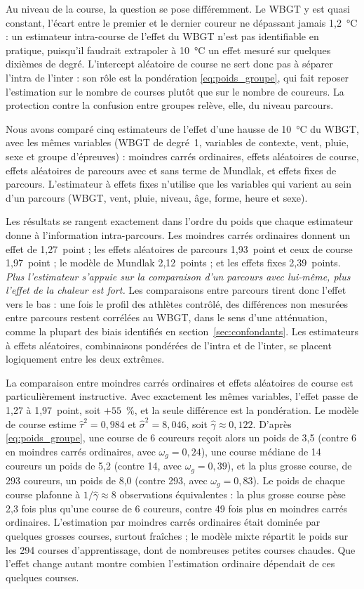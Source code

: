 \documentclass[11pt,a4paper]{article}
\begin{document}
Au niveau de la course, la question se pose différemment. Le WBGT y est quasi constant, l'écart entre le premier et le
dernier coureur ne dépassant jamais 1,2~°C : un estimateur intra-course de l'effet du WBGT n'est pas identifiable en
pratique, puisqu'il faudrait extrapoler à 10~°C un effet mesuré sur quelques dixièmes de degré. L'intercept aléatoire
de course ne sert donc pas à séparer l'intra de l'inter : son rôle est la pondération \eqref{eq:poids_groupe}, qui
fait reposer l'estimation sur le nombre de courses plutôt que sur le nombre de coureurs. La protection contre la
confusion entre groupes relève, elle, du niveau parcours.

Nous avons comparé cinq estimateurs de l'effet d'une hausse de 10~°C du WBGT, avec les mêmes variables (WBGT de
degré~1, variables de contexte, vent, pluie, sexe et groupe d'épreuves) : moindres carrés ordinaires, effets
aléatoires de course, effets aléatoires de parcours avec et sans terme de Mundlak, et effets fixes de parcours.
L'estimateur à effets fixes n'utilise que les variables qui varient au sein d'un parcours (WBGT, vent, pluie, niveau,
âge, forme, heure et sexe).

Les résultats se rangent exactement dans l'ordre du poids que chaque estimateur donne à l'information
intra-parcours. Les moindres carrés ordinaires donnent un effet de 1,27~point ; les effets aléatoires de parcours
1,93~point et ceux de course 1,97~point ; le modèle de Mundlak 2,12~points ; et les effets fixes 2,39~points.
\emph{Plus l'estimateur s'appuie sur la comparaison d'un parcours avec lui-même, plus l'effet de la chaleur est
fort.} Les comparaisons entre parcours tirent donc l'effet vers le bas : une fois le profil des athlètes contrôlé, des
différences non mesurées entre parcours restent corrélées au WBGT, dans le sens d'une atténuation, comme la plupart
des biais identifiés en section~\ref{sec:confondants}. Les estimateurs à effets aléatoires, combinaisons pondérées
de l'intra et de l'inter, se placent logiquement entre les deux extrêmes.

La comparaison entre moindres carrés ordinaires et effets aléatoires de course est particulièrement instructive.
Avec exactement les mêmes variables, l'effet passe de 1,27 à 1,97~point, soit $+55$~\%, et la seule différence est la
pondération. Le modèle de course estime $\hat\tau^2 = 0{,}984$ et $\hat\sigma^2 = 8{,}046$, soit
$\hat\gamma \approx 0{,}122$. D'après \eqref{eq:poids_groupe}, une course de 6 coureurs reçoit alors un poids de 3,5
(contre 6 en moindres carrés ordinaires, avec $\omega_g = 0{,}24$), une course médiane de 14 coureurs un poids de 5,2
(contre 14, avec $\omega_g = 0{,}39$), et la plus grosse course, de 293 coureurs, un poids de 8,0 (contre 293, avec
$\omega_g = 0{,}83$). Le poids de chaque course plafonne à $1/\hat\gamma \approx 8$ observations équivalentes : la plus
grosse course pèse 2,3 fois plus qu'une course de 6 coureurs, contre 49 fois plus en moindres carrés ordinaires.
L'estimation par moindres carrés ordinaires était dominée par quelques grosses courses, surtout fraîches ; le modèle
mixte répartit le poids sur les 294 courses d'apprentissage, dont de nombreuses petites courses chaudes. Que l'effet
change autant montre combien l'estimation ordinaire dépendait de ces quelques courses.
\end{document}
